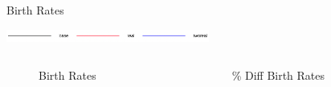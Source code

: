 \documentclass{beamer}
\begin{document}
		\begin{frame}{Birth Rates}
			\begin{center}
				\includegraphics[width=0.5\textwidth]{Images/legend.png}
			\end{center}

			\begin{columns}
				\begin{column}{0.5\paperwidth}
					\begin{figure}
						\caption{Birth Rates}
					\end{figure}
				\end{column}

				\begin{column}{0.5\paperwidth}
					\begin{figure}
						\caption{\% Diff Birth Rates}
					\end{figure}
				\end{column}
			\end{columns}	


\end{frame}
\end{document}

